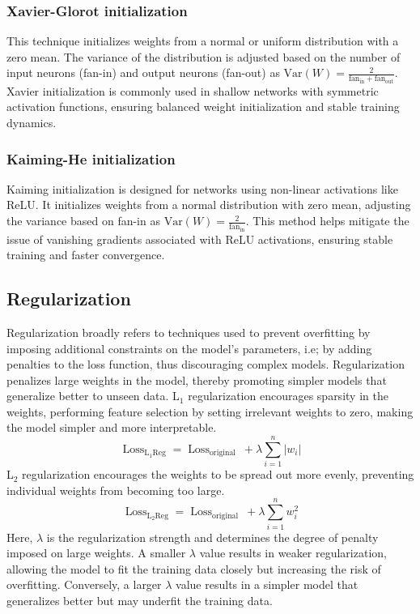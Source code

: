 \subsubsection{Xavier-Glorot initialization}
This technique initializes weights from a normal or uniform distribution with a zero mean. The variance of the distribution is adjusted based on the number of input neurons (fan-in) and output neurons (fan-out) as $\text{Var}(W) = \frac{2}{\text{fan}_{\text{in}} + \text{fan}_{\text{out}}}$. Xavier initialization is commonly used in shallow networks with symmetric activation functions, ensuring balanced weight initialization and stable training dynamics. 
\subsubsection{Kaiming-He initialization}
Kaiming initialization is designed for networks using non-linear activations like ReLU. It initializes weights from a normal distribution with zero mean, adjusting the variance based on fan-in as $ \text{Var}(W) = \frac{2}{\text{fan}_{\text{in}}}$. This method helps mitigate the issue of vanishing gradients associated with ReLU activations, ensuring stable training and faster convergence.
\subsection{Regularization}
Regularization broadly refers to techniques used to prevent overfitting by imposing additional constraints on the model's parameters, i.e; by adding penalties to the loss function, thus discouraging complex models. Regularization penalizes large weights in the model, thereby promoting simpler models that generalize better to unseen data. 
L$_1$ regularization encourages sparsity in the weights, performing feature selection by setting irrelevant weights to zero, making the model simpler and more interpretable. 
\[ \operatorname{Loss}_{\mathrm{L}_1 \text{Reg}}=\operatorname{Loss}_{\text {original }}+\lambda \sum_{i=1}^n\left|w_i\right| \]
L$_2$ regularization encourages the weights to be spread out more evenly, preventing individual weights from becoming too large.
\[ \operatorname{Loss}_{\mathrm{L}_2 \text{Reg}}=\operatorname{Loss}_{\text {original }}+\lambda \sum_{i=1}^n w^2_i \]
Here, $\lambda$ is the regularization strength and determines the degree of penalty imposed on large weights. A smaller $\lambda$ value results in weaker regularization, allowing the model to fit the training data closely but increasing the risk of overfitting. Conversely, a larger $\lambda$ value results in a simpler model that generalizes better but may underfit the training data.

